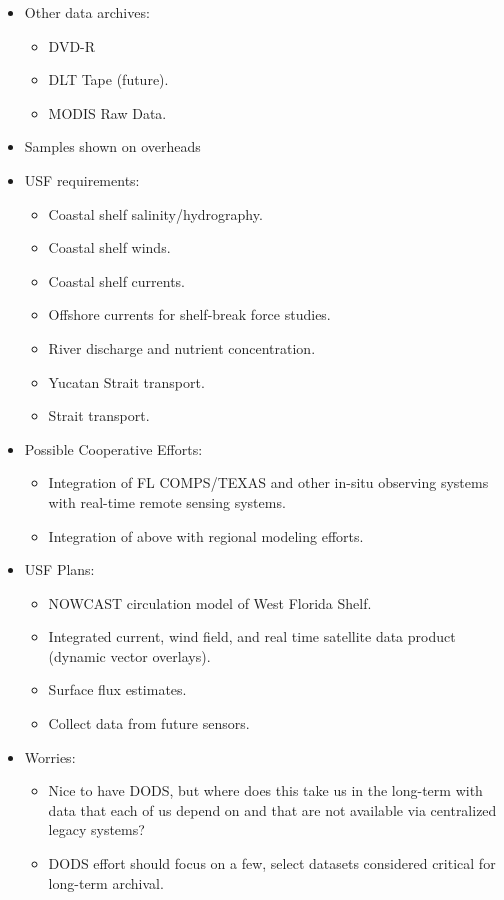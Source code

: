 \begin{itemize}
\item Other data archives:
  \begin{itemize}
  \item DVD-R
  \item DLT Tape (future).
  \item MODIS Raw Data.
  \end{itemize}


\item Samples shown on overheads


\item USF requirements:
  \begin{itemize}
  \item Coastal shelf salinity/hydrography.
  \item Coastal shelf winds.
  \item Coastal shelf currents.
  \item Offshore currents for shelf-break force studies.
  \item River discharge and nutrient concentration.
  \item Yucatan Strait transport.
  \item Strait transport.
  \end{itemize}


\item Possible Cooperative Efforts:
  \begin{itemize}
  \item Integration of FL COMPS/TEXAS and other in-situ observing systems with real-time remote 
    sensing systems.
  \item Integration of above with regional modeling efforts.
  \end{itemize}


\item USF Plans:
  \begin{itemize}
  \item NOWCAST circulation model of West Florida Shelf.
  \item Integrated current, wind field, and real time satellite data product (dynamic vector overlays).
  \item Surface flux estimates.
  \item Collect data from future sensors.
  \end{itemize}

\item Worries:
  \begin{itemize}
  \item Nice to have DODS, but where does this take us in the long-term with data that each of us 
    depend on and that are not available via centralized legacy systems?
  \item DODS effort should focus on a few, select datasets considered critical for long-term archival.
  \end{itemize}
\end{itemize}


